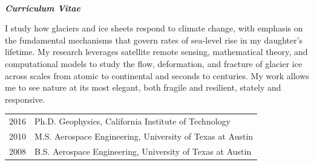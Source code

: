 \documentclass[11pt, oneside]{article}
\newcommand{\cvsection}[1]{%
  \vspace{4mm}%
  \noindent{\large\sffamily\bfseries\color{DeepTeal}#1}%
  \vspace{1mm}%
  \par\noindent{\color{CaltechOrange}\rule{\textwidth}{0.8pt}}%
  \vspace{2mm}%
}
\newenvironment{changemargin}[2]{%
  \list{}{\rightmargin#2\leftmargin#1
  \parsep=0pt\topsep=0pt\partopsep=0pt}
  \item[]}
  {\endlist}
\newenvironment{indentmore}{\begin{changemargin}{4mm}{0cm}}{\end{changemargin}}
\newenvironment{indenttabular}{\begin{changemargin}{2mm}{0cm}}{\end{changemargin}}
\begin{document}
\pagestyle{others}
\thispagestyle{first}
\enlargethispage{-0.45in}

\vspace{-2mm}
\begin{center}
  \noindent{\color{CaltechOrange}\rule{0.4\textwidth}{1.2pt}}\\[3pt]
  {\Large\sffamily\bfseries\color{DeepTeal}\textit{Curriculum Vitae}}\\[2pt]
  \noindent{\color{CaltechOrange}\rule{0.4\textwidth}{1.2pt}}
\end{center}

\vspace{2mm}

\cvsection{Bio}
\begin{indentmore}
I study how glaciers and ice sheets respond to climate change, with emphasis on the fundamental mechanisms that govern rates of sea-level rise in my daughter's lifetime. My research leverages satellite remote sensing, mathematical theory, and computational models to study the flow, deformation, and fracture of glacier ice across scales from atomic to continental and seconds to centuries. My work allows me to see nature at its most elegant, both fragile and resilient, stately and responsive.
\end{indentmore}

\cvsection{Education}
\begin{indenttabular} \vspace{1mm}
\begin{tabular}{l l}
2016 & Ph.D. Geophysics, California Institute of Technology \\
2010 & M.S. Aerospace Engineering, University of Texas at Austin \\
2008 & B.S. Aerospace Engineering, University of Texas at Austin \\
\end{tabular}
\end{indenttabular}
\end{document}
